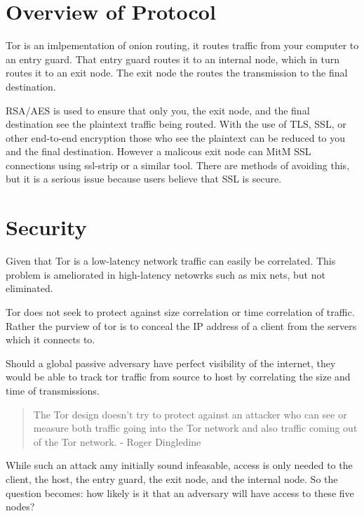 \section{Overview of Protocol}
Tor is an imlpementation of onion routing, it routes traffic from your computer
to an entry guard. That entry guard routes it to an internal node, which in turn
routes it to an exit node. The exit node the routes the transmission to the
final destination.

RSA/AES is used to ensure that only you, the exit node, and the final
destination see the plaintext traffic being routed. With the use of TLS, SSL, or
other end-to-end encryption those who see the plaintext can be reduced to you
and the final destination. However a malicous exit node can MitM SSL connections
using ssl-strip or a similar tool. There are methods of avoiding this, but it is
a serious issue because users believe that SSL is secure.

\section{Security}
Given that Tor is a low-latency network traffic can easily be correlated. This
problem is ameliorated in high-latency netowrks such as mix nets, but not
eliminated.

Tor does not seek to protect against size correlation or time correlation of
traffic. Rather the purview of tor is to conceal the IP address of a client from
the servers which it connects to.

Should a global passive adversary have perfect visibility of the internet, they
would be able to track tor traffic from source to host by correlating the size
and time of transmissions.

\begin{quote}
The Tor design doesn't try to protect against an attacker who can see or measure
both traffic going into the Tor network and also traffic coming out of the Tor
network\cite{torOneCell}. - Roger Dingledine
\end{quote}

While such an attack amy initially sound infeasable, access is only needed to
the client, the host, the entry guard, the exit node, and the internal node.
So the question becomes: how likely is it that an adversary will have access to
these five nodes?

